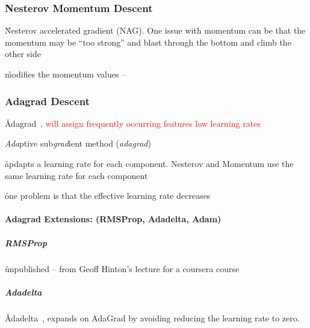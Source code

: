 

\subsubsection{Nesterov Momentum Descent}

\r{Nesterov accelerated gradient (NAG). One issue with momentum can be that the momentum may be ``too strong'' and blast through the bottom and climb the other side}

\r{modifies the momentum values -- }





\subsubsection{Adagrad Descent}

\r{Adagrad~\cite{duchi2011adaptive}, \textcolor{red}{will assign frequently occurring features low learning rates}}

\r{\textit{Ada}ptive sub\textit{grad}ient method (\textit{adagrad})}

\r{apdapts a learning rate for each component. Nesterov and Momentum use the same learning rate for each component}

\r{one problem is that the effective learning rate decreases}

\paragraph{Adagrad Extensions: (RMSProp, Adadelta, Adam)}


\subparagraph{RMSProp}

\r{unpublished -- from Geoff Hinton's lecture for a coursera course}


\subparagraph{Adadelta}


\r{Adadelta~\cite{zeiler2012adadelta}, expands on AdaGrad by avoiding reducing the learning rate to zero.}


